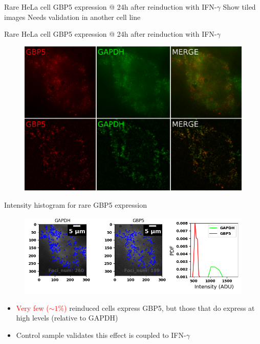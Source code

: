 \documentclass[aspectratio=1610]{beamer}					%
\begin{document}
\begin{frame}{Rare HeLa cell GBP5 expression @ 24h after reinduction with IFN-$\gamma$}
Show tiled images
Needs validation in another cell line
\end{frame}

\begin{frame}{Rare HeLa cell GBP5 expression @ 24h after reinduction with IFN-$\gamma$}
\begin{figure}
\includegraphics[width=12cm]{Stains.png}
\end{figure}
\end{frame}

\begin{frame}{Intensity histogram for rare GBP5 expression}
\begin{figure}
\includegraphics[width=14cm]{Detection.png}
\end{figure}
\begin{itemize}
\item \textcolor{red}{Very few ($\sim 1\%$)} reinduced cells express GBP5, but those that do express at high levels (relative to GAPDH)
\item Control sample validates this effect is coupled to IFN-$\gamma$ 
\end{itemize}
\end{frame}
\end{document}
